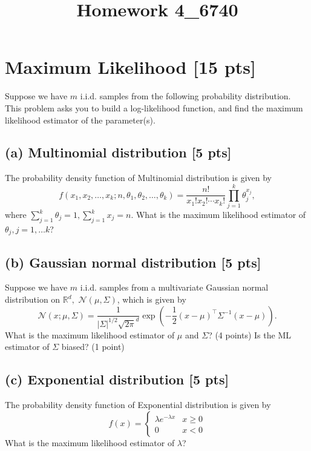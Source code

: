 \documentclass[12pt]{article}
\title{Homework 4_6740}
\begin{document}
\MakeScribeTop
\section{Maximum Likelihood [15 pts]}

Suppose we have $m$ i.i.d. samples from the following probability distribution. This
problem asks you to build a log-likelihood function, and find the
maximum likelihood estimator of the parameter(s).

\subsection*{(a) Multinomial distribution [5 pts]}
The probability density function of Multinomial distribution is given by 
$$f(x_1,x_2,\dots,x_k;n,\theta_1,\theta_2,\dots,\theta_k)=\frac{n!}{x_1!x_2!\cdots x_k!}\prod_{j=1}^{k}\theta_j^{x_j},$$
where $\sum_{j=1}^k\theta_j=1,\sum_{j=1}^k x_j=n$. What is the maximum likelihood estimator of $\theta_j, j=1,\dots k$?

\subsection*{(b) Gaussian normal distribution [5 pts]}
Suppose we have $m$ i.i.d. samples from a multivariate Gaussian normal distribution on $\mathbb{R}^d,$ 
$\mathcal{N}(\mu, \Sigma)$, which is given by
\begin{equation}
	\mathcal{N}(x; \mu, \Sigma) = \frac{1}{|\Sigma|^{1/2} \sqrt{2\pi}^d} \exp
	\left( -\dfrac{1}{2} (x - \mu)^\top \Sigma^{-1} (x - \mu)\right).\nonumber
\end{equation}
What is the maximum likelihood estimator of $\mu$ and $\Sigma$? (4 points) Is the ML estimator of $\Sigma$ biased? (1 point)
\vspace{1cm}

\subsection*{(c) Exponential distribution [5 pts]}
The probability density function of Exponential distribution is
given by
\begin{equation} \nonumber
f(x) = \left\{\begin{matrix}
\lambda e^{-\lambda x} & x \ge 0\\
0 & x < 0
\end{matrix}\right.
\end{equation}
What is the maximum likelihood estimator of $\lambda$?
\end{document}
